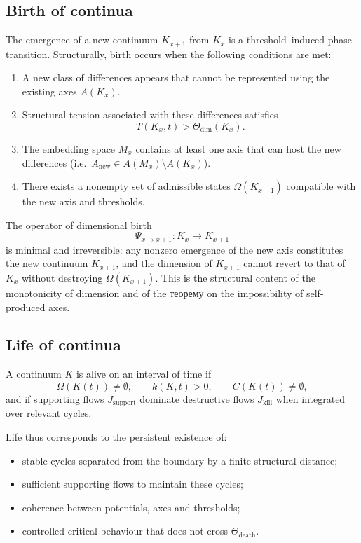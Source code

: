 \subsection{Birth of continua}

The emergence of a new continuum \(K_{x+1}\) from \(K_x\) is a threshold–induced phase transition.
Structurally, birth occurs when the following conditions are met:

\begin{enumerate}
    \item A new class of differences appears that cannot be represented using the existing axes \(A(K_x)\).
    \item Structural tension associated with these differences satisfies
          \[
              T(K_x,t) > \Theta_{\mathrm{dim}}(K_x).
          \]
    \item The embedding space \(M_x\) contains at least one axis that can host the new differences (i.e.\ \(A_{\mathrm{new}} \in A(M_x) \setminus A(K_x)\)).
    \item There exists a nonempty set of admissible states \(\Omega(K_{x+1})\) compatible with the new axis and thresholds.
\end{enumerate}

The operator of dimensional birth
\[
    \Psi_{x\to x+1}: K_x \to K_{x+1}
\]
is minimal and irreversible: any nonzero emergence of the new axis constitutes the new continuum \(K_{x+1}\), and the dimension of \(K_{x+1}\) cannot revert to that of \(K_x\) without destroying \(\Omega(K_{x+1})\).
This is the structural content of the monotonicity of dimension and of the теорему on the impossibility of self-produced axes.

\subsection{Life of continua}

A continuum \(K\) is alive on an interval of time if
\[
    \Omega(K(t)) \neq \emptyset,\qquad
    k(K,t) > 0,\qquad
    C(K(t)) \neq \emptyset,
\]
and if supporting flows \(J_{\mathrm{support}}\) dominate destructive flows \(J_{\mathrm{kill}}\) when integrated over relevant cycles.

Life thus corresponds to the persistent existence of:
\begin{itemize}
    \item stable cycles separated from the boundary by a finite structural distance;
    \item sufficient supporting flows to maintain these cycles;
    \item coherence between potentials, axes and thresholds;
    \item controlled critical behaviour that does not cross \(\Theta_{\mathrm{death}}\).
\end{itemize}

